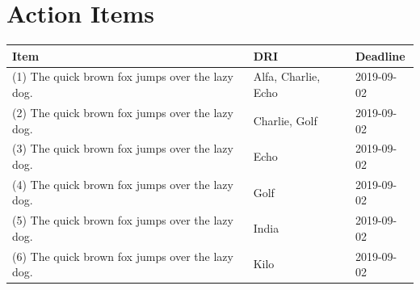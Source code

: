\documentclass[12pt]{article}
\begin{document}
\section*{Action Items}
\renewcommand{\arraystretch}{1.75}
\begin{table}[H]
    \begin{tabular}{p{3.25in} p{1.75in} p{1in}}
        \toprule
        \textbf{Item} & \textbf{DRI\footnotemark} & \textbf{Deadline} \\
        \midrule
        (1) The quick brown fox jumps over the lazy dog. & Alfa, Charlie, Echo & 2019-09-02 \\
        (2) The quick brown fox jumps over the lazy dog. & Charlie, Golf       & 2019-09-02 \\
        (3) The quick brown fox jumps over the lazy dog. & Echo                & 2019-09-02 \\
        (4) The quick brown fox jumps over the lazy dog. & Golf                & 2019-09-02 \\
        (5) The quick brown fox jumps over the lazy dog. & India               & 2019-09-02 \\
        (6) The quick brown fox jumps over the lazy dog. & Kilo                & 2019-09-02 \\
        \bottomrule
    \end{tabular}
    \label{tab:action_items}
\end{table}

\end{document}
